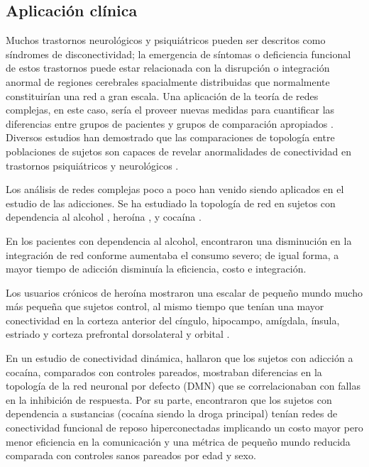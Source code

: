 \subsection{Aplicación clínica}
Muchos trastornos neurológicos y psiquiátricos pueden ser descritos como síndromes de disconectividad; la emergencia de síntomas o deficiencia funcional de estos trastornos puede estar relacionada con la disrupción o integración anormal de regiones cerebrales spacialmente distribuidas que normalmente constituirían una red a gran escala. Una aplicación de la teoría de redes complejas, en este caso, sería el proveer nuevas medidas para cuantificar las diferencias entre grupos de pacientes y grupos de comparación apropiados \parencite{Bullmore2009a}. Diversos estudios han demostrado que las comparaciones de topología entre poblaciones de sujetos son capaces de revelar anormalidades de conectividad en trastornos psiquiátricos y neurológicos \parencite{Bassett2009}. \par
Los análisis de redes complejas poco a poco han venido siendo aplicados en el estudio de las adicciones. Se ha estudiado la topología de red en sujetos con dependencia al alcohol \parencite{Sjoerds2017}, heroína \parencite{Liu2009}, y cocaína \parencite{Zhang2018, Wang2015a}. \par
En los pacientes con dependencia al alcohol, \textcite{Sjoerds2017} encontraron una disminución en la integración de red conforme aumentaba el consumo severo; de igual forma, a mayor tiempo de adicción disminuía la eficiencia, costo e integración.\par
Los usuarios crónicos de heroína mostraron una escalar de pequeño mundo mucho más pequeña que sujetos control, al mismo tiempo que tenían una mayor conectividad en la corteza anterior del cíngulo, hipocampo, amígdala, ínsula, estriado y corteza prefrontal dorsolateral y orbital \parencite{Liu2009}. \par
En un estudio de conectividad dinámica, \textcite{Zhang2018} hallaron que los sujetos con adicción a cocaína, comparados con controles pareados, mostraban diferencias en la topología de la red neuronal por defecto (DMN) que se correlacionaban con fallas en la inhibición de respuesta.
Por su parte, \textcite{Wang2015a} encontraron que los sujetos con dependencia a sustancias (cocaína siendo la droga principal) tenían redes de conectividad funcional de reposo hiperconectadas \textemdash{}implicando un costo mayor\textemdash{} pero menor eficiencia en la comunicación y una métrica de pequeño mundo reducida comparada con controles sanos pareados por edad y sexo.
